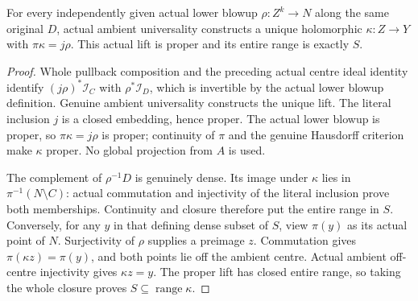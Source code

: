 \begin{theorem}
\label{hir:actual-closed-contact-proper-strict-lift}
\leanok
For every independently given actual lower blowup $\rho:Z^k\to N$
along the same original $D$, actual ambient universality constructs a
unique holomorphic $\kappa:Z\to Y$ with $\pi\kappa=j\rho$.
This actual lift is proper and its entire range is exactly $S$.
\end{theorem}
\begin{proof}
Whole pullback composition and the preceding actual centre ideal
identity identify $(j\rho)^*\mathcal I_C$ with
$\rho^*\mathcal I_D$, which is invertible by the actual lower blowup
definition. Genuine ambient universality constructs the unique lift.
The literal inclusion $j$ is a closed embedding, hence proper. The
actual lower blowup is proper, so $\pi\kappa=j\rho$ is proper;
continuity of $\pi$ and the genuine Hausdorff criterion make $\kappa$
proper. No global projection from $A$ is used.

The complement of $\rho^{-1}D$ is genuinely dense. Its image under
$\kappa$ lies in $\pi^{-1}(N\setminus C)$: actual commutation and
injectivity of the literal inclusion prove both memberships. Continuity
and closure therefore put the entire range in $S$. Conversely, for any
$y$ in that defining dense subset of $S$, view $\pi(y)$ as its actual
point of $N$. Surjectivity of $\rho$ supplies a preimage $z$.
Commutation gives $\pi(\kappa z)=\pi(y)$, and both points lie off
the ambient centre. Actual ambient off-centre injectivity gives
$\kappa z=y$. The proper lift has closed entire range, so taking the
whole closure proves $S\subseteq\operatorname{range}\kappa$.
\end{proof}

